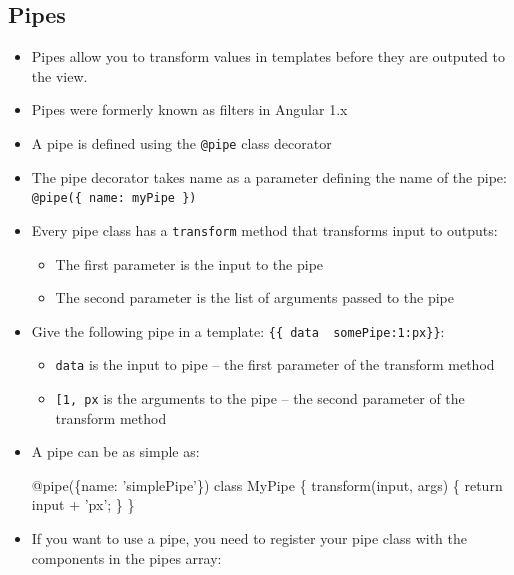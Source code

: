 \documentclass[12pt,]{article}
\newenvironment{Shaded}{}{}
\newcommand{\KeywordTok}[1]{\textcolor[rgb]{0.00,0.00,1.00}{{#1}}}
\newcommand{\FunctionTok}[1]{{#1}}
\newcommand{\NormalTok}[1]{{#1}}
\providecommand{\tightlist}{%
  \setlength{\itemsep}{0pt}\setlength{\parskip}{0pt}}
\begin{document}
\subsection{Pipes}\label{pipes}

\begin{itemize}
\item
  Pipes allow you to transform values in templates before they are
  outputed to the view.
\item
  Pipes were formerly known as filters in Angular 1.x
\item
  A pipe is defined using the \texttt{@pipe} class decorator
\item
  The pipe decorator takes name as a parameter defining the name of the
  pipe:
  \texttt{@pipe(\{\ name:\ \textquotesingle{}myPipe\textquotesingle{}\ \})}
\item
  Every pipe class has a \texttt{transform} method that transforms input
  to outputs:

  \begin{itemize}
  \tightlist
  \item
    The first parameter is the input to the pipe
  \item
    The second parameter is the list of arguments passed to the pipe
  \end{itemize}
\item
  Give the following pipe in a template:
  \texttt{\{\{\ data\ \textbar{}\ somePipe:1:\textquotesingle{}px\textquotesingle{}\}\}}:

  \begin{itemize}
  \tightlist
  \item
    \texttt{data} is the input to pipe -- the first parameter of the
    transform method
  \item
    \texttt{{[}1,\ \textquotesingle{}px\textquotesingle{}{]}} is the
    arguments to the pipe -- the second parameter of the transform
    method
  \end{itemize}
\item
  A pipe can be as simple as:

\begin{Shaded}
\begin{Highlighting}[numbers=left,,]
\FunctionTok{@pipe}\NormalTok{(\{name: 'simplePipe'\})}
\KeywordTok{class} \NormalTok{MyPipe \{}
  \FunctionTok{transform}\NormalTok{(input, args) \{ }\KeywordTok{return} \NormalTok{input + 'px'; \}}
\NormalTok{\}}
\end{Highlighting}
\end{Shaded}
\item
  If you want to use a pipe, you need to register your pipe class with
  the components in the pipes array:


\end{itemize}
\end{document}
